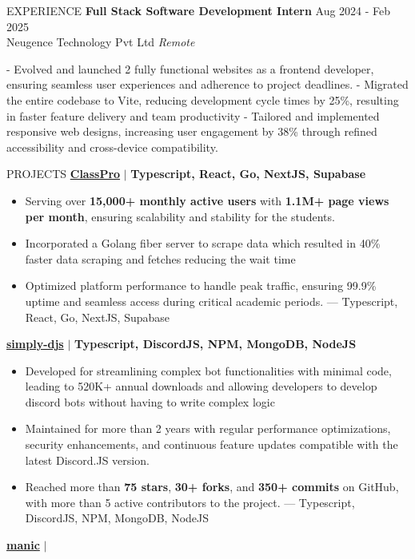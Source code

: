 \documentclass{resume} %
\begin{document}
\begin{rSection}{EXPERIENCE}
\textbf{Full Stack Software Development Intern} \hfill Aug 2024 - Feb 2025\\
Neugence Technology Pvt Ltd \hfill \textit{Remote}

- Evolved and launched 2 fully functional websites as a frontend developer, ensuring seamless user experiences and adherence to project deadlines.
- Migrated the entire codebase to Vite, reducing development cycle times by 25\%, resulting in faster feature delivery and team productivity
- Tailored and implemented responsive web designs, increasing user engagement by 38\% through refined accessibility and cross-device compatibility.

\end{rSection}



\begin{rSection}{PROJECTS}    
    \textbf{\href{https://github.com/Rahuletto/ClassPro}{ClassPro}} \(\mid\) \textbf{Typescript, React, Go, NextJS, Supabase}
\begin{itemize}
\itemsep -3pt{}
\item Serving over \textbf{15,000+ monthly active users} with \textbf{1.1M+ page views per month}, ensuring scalability and stability for the students.
\item Incorporated a Golang fiber server to scrape data which resulted in 40\% faster data scraping and fetches reducing the wait time
\item Optimized platform performance to handle peak traffic, ensuring 99.9\% uptime and seamless access during critical academic periods.
---
Typescript, React, Go, NextJS, Supabase
\end{itemize}
\textbf{\href{https://github.com/Rahuletto/simply-djs}{simply-djs}} \(\mid\) \textbf{Typescript, DiscordJS, NPM, MongoDB, NodeJS}
\begin{itemize}
\itemsep -3pt{}
\item Developed for streamlining complex bot functionalities with minimal code, leading to 520K+ annual downloads and allowing developers to develop discord bots without having to write complex logic
\item Maintained for more than 2 years with regular performance optimizations, security enhancements, and continuous feature updates compatible with the latest Discord.JS version.
\item Reached more than \textbf{75 stars}, \textbf{30+ forks}, and \textbf{350+ commits} on GitHub, with more than 5 active contributors to the project.
---
Typescript, DiscordJS, NPM, MongoDB, NodeJS
\end{itemize}
\textbf{\href{https://github.com/Rahuletto/manic}{manic}} \(\mid\) \textbf{}
\end{rSection}
\end{document}

